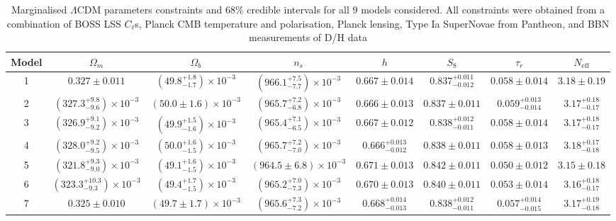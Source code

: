 \begin{landscape}
\begin{table}
    \centering
    \caption[Marginalised $\Lambda$CDM parameters constraints and 68\% credible intervals for all 9 models considered.]{Marginalised $\Lambda$CDM parameters constraints and 68\% credible intervals for all 9 models considered. All constraints were obtained from a combination of BOSS LSS $C_{\ell}$s, Planck CMB temperature and polarisation, Planck lensing, Type Ia SuperNovae from Pantheon, and BBN measurements of D/H data}
    \label{tab:model_paramsLCDM}
    {\begin{tabular}{c|ccccccc}
        \hline
        \hline
		Model & $\Omega_m$ & $\Omega_b$ & $n_s$ & $h$ & $S_8$ & $\tau_{r}$ & $N_{\text{eff}}$\\ 
		\hline
		\hline
	1 & $0.327\pm 0.011$ & $\left( 49.8^{+1.8}_{-1.7} \right) \times 10^{-3}$ & $\left( 966.1^{+7.5}_{-7.7} \right) \times 10^{-3}$ & $0.667\pm 0.014$ & $0.837^{+0.011}_{-0.012}$ & $0.058\pm 0.014$ & $3.18\pm 0.19$ \\ 
		2 & $\left( 327.3^{+9.8}_{-9.6} \right) \times 10^{-3}$ & $\left( 50.0\pm 1.6 \right) \times 10^{-3}$ & $\left( 965.7^{+7.2}_{-6.8} \right) \times 10^{-3}$ & $0.666\pm 0.013$ & $0.837\pm 0.011$ & $0.059^{+0.013}_{-0.014}$ & $3.17^{+0.18}_{-0.17}$ \\ 
		3 & $\left( 326.9^{+9.1}_{-9.2} \right) \times 10^{-3}$ & $\left( 49.9^{+1.5}_{-1.6} \right) \times 10^{-3}$ & $\left( 965.4^{+7.1}_{-6.5} \right) \times 10^{-3}$ & $0.667\pm 0.012$ & $0.838^{+0.012}_{-0.011}$ & $0.058\pm 0.014$ & $3.17^{+0.18}_{-0.17}$ \\ 
		4 & $\left( 328.0^{+9.2}_{-9.5} \right) \times 10^{-3}$ & $\left( 50.0^{+1.6}_{-1.5} \right) \times 10^{-3}$ & $\left( 965.7^{+7.2}_{-7.0} \right) \times 10^{-3}$ & $0.666^{+0.013}_{-0.012}$ & $0.838\pm 0.011$ & $0.058\pm 0.013$ & $3.18^{+0.17}_{-0.18}$ \\ 
		5 & $\left( 321.8^{+9.3}_{-9.0} \right) \times 10^{-3}$ & $\left( 49.1^{+1.6}_{-1.5} \right) \times 10^{-3}$ & $\left( 964.5\pm 6.8 \right) \times 10^{-3}$ & $0.671\pm 0.013$ & $0.842\pm 0.011$ & $0.050\pm 0.012$ & $3.15\pm 0.18$ \\ 
		6 & $\left( 323.3^{+10.3}_{-9.3} \right) \times 10^{-3}$ & $\left( 49.4^{+1.7}_{-1.5} \right) \times 10^{-3}$ & $\left( 965.2^{+7.0}_{-7.3} \right) \times 10^{-3}$ & $0.670\pm 0.013$ & $0.840\pm 0.011$ & $0.053\pm 0.014$ & $3.16^{+0.18}_{-0.17}$ \\ 
		7 & $0.325\pm 0.010$ & $\left( 49.7\pm 1.7 \right) \times 10^{-3}$ & $\left( 965.6^{+7.3}_{-7.2} \right) \times 10^{-3}$ & $0.668^{+0.014}_{-0.013}$ & $0.838^{+0.012}_{-0.011}$ & $0.057^{+0.014}_{-0.015}$ & $3.17^{+0.19}_{-0.18}$ \\ 

\end{tabular}}
\end{table}
\end{landscape}
